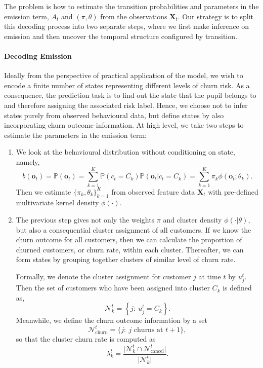 The problem is how to estimate the transition probabilities and parameters in the emission term, $A_t$ and $(\pi, \theta)$ from the observations $\mathbf{X}_t$. Our strategy is to split this decoding process into two separate steps, where we first make inference on emission and then uncover the temporal structure configured by transition.

\paragraph*{Decoding Emission}

Ideally from the perspective of practical application of the model, we wish to encode a finite number of states representing different levels of churn risk. As a consequence, the prediction task is to find out the state that the pupil belongs to and therefore assigning the associated risk label. Hence, we choose not to infer states purely from observed behavioural data, but define states by also incorporating churn outcome information. At high level, we take two steps to estimate the parameters in the emission term:
\begin{enumerate}
\item We look at the behavioural distribution without conditioning on state, namely,
\begin{equation}
b(\mathbf{o}_t) = \mathbb{P} (\mathbf{o}_t) = \sum_{k=1}^K \mathbb{P} (c_t = C_k) \mathbb{P} (\mathbf{o}_t | c_t = C_k) = \sum_{k=1}^K \pi_k \phi(\mathbf{o}_t ; \theta_k).
\end{equation}
Then we estimate $\{ \pi_k, \theta_k \}_{k=1}^K$ from observed feature data $\mathbf{X}_t$ with pre-defined multivariate kernel density $\phi(\cdot)$.

\item The previous step gives not only the weights $\pi$ and cluster density $\phi(\cdot | \theta)$, but also a consequential cluster assignment of all customers. If we know the churn outcome for all customers, then we can calculate the proportion of churned customers, or churn rate, within each cluster. Thereafter, we can form states by grouping together clusters of similar level of churn rate.

Formally, we denote the cluster assignment for customer $j$ at time $t$ by $u_j^t$. Then the set of customers who have been assigned into cluster $C_k$ is defined as,
\begin{equation}
\mathcal{N}_k^t = \left\lbrace j :~ u_j^t = C_k \right\rbrace.
\end{equation}
Meanwhile, we define the churn outcome information by a set
\begin{equation}
\mathcal{N}_\text{churn}^t = \{j: ~j \text{ churns at } t+1 \},
\end{equation}
so that the cluster churn rate is computed as
\begin{equation}
\lambda_k^t = \frac{\vert \mathcal{N}_k^t \cap \mathcal{N}_\text{cancel}^t \vert}{\vert  \mathcal{N}_k^t \vert}.
\end{equation}

\end{enumerate}


